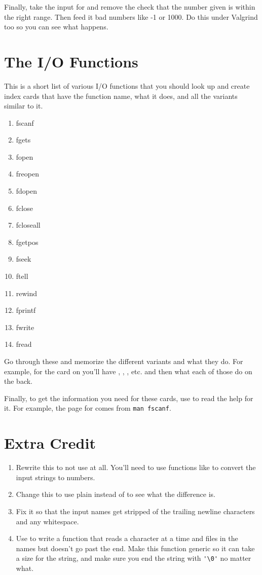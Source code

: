 Finally, take the input for  and remove the check that the
number given is within the right range.  Then feed it bad numbers like -1 or
1000.  Do this under Valgrind too so you can see what happens.

\section{The I/O Functions}

This is a short list of various I/O functions that you should look up and
create index cards that have the function name, what it does, and all the
variants similar to it.

\begin{enumerate}
\item fscanf
\item fgets
\item fopen
\item freopen
\item fdopen
\item fclose
\item fcloseall
\item fgetpos
\item fseek
\item ftell
\item rewind
\item fprintf
\item fwrite
\item fread
\end{enumerate}

Go through these and memorize the different variants and what they do.  For example,
for the card on  you'll have , , ,
etc. and then what each of those do on the back.

Finally, to get the information you need for these cards, use  to
read the help for it.  For example, the page for  comes from 
\verb|man fscanf|.


\section{Extra Credit}

\begin{enumerate}
\item Rewrite this to not use  at all.  You'll need to use
    functions like  to convert the input strings to numbers.
\item Change this to use plain  instead of  to
    see what the difference is.
\item Fix it so that the input names get stripped of the trailing newline
    characters and any whitespace.
\item Use  to write a function that reads a character at a time
    and files in the names but doesn't go past the end.  Make this function
    generic so it can take a size for the string, and make sure you end
    the string with \verb|'\0'| no matter what.
\end{enumerate}

